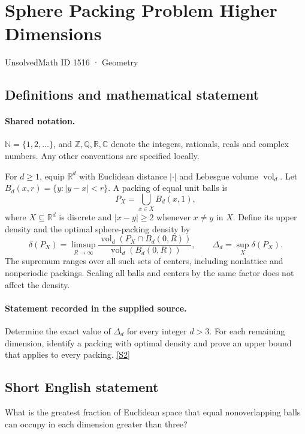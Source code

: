 \documentclass[11pt]{article}
\newcommand{\sref}[2]{\hyperlink{source:#1:#2}{[S#2]}}
\begin{document}
\setcounter{section}{1515}
\section{Sphere Packing Problem Higher Dimensions}\label{1516}
{\small\sffamily UnsolvedMath ID 1516 · Geometry}
\subsection{Definitions and mathematical statement}

\paragraph{Shared notation.}$\mathbb N=\{1,2,\ldots\}$, and $\mathbb Z,\mathbb Q,\mathbb R,\mathbb C$ denote the integers, rationals, reals and complex numbers. Any other conventions are specified locally.


For \(d\ge1\), equip \(\mathbb R^d\) with Euclidean distance
\(|\cdot|\) and Lebesgue volume \(\operatorname{vol}_d\).
Let \(B_d(x,r)=\{y:|y-x|<r\}\).
A packing of equal unit balls is
\[
                P_X=\bigcup_{x\in X}B_d(x,1),
\]
where \(X\subseteq\mathbb R^d\) is discrete and
\(|x-y|\ge2\) whenever \(x\ne y\) in \(X\).
Define its upper density and the optimal sphere-packing density by
\[
 \delta(P_X)=\limsup_{R\to\infty}
     \frac{\operatorname{vol}_d(P_X\cap B_d(0,R))}
          {\operatorname{vol}_d(B_d(0,R))},
 \qquad \Delta_d=\sup_X\delta(P_X).
\]
The supremum ranges over all such sets of centers, including nonlattice
and nonperiodic packings. Scaling all balls and centers by the same factor
does not affect the density.
\paragraph{Statement recorded in the supplied source.}
Determine the exact value of \(\Delta_d\) for every integer \(d>3\).
For each remaining dimension, identify a packing with optimal density
and prove an upper bound that applies to every packing. \sref{1516}{2}
\subsection{Short English statement}
What is the greatest fraction of Euclidean space that equal nonoverlapping balls can occupy in each dimension greater than three?
\end{document}
